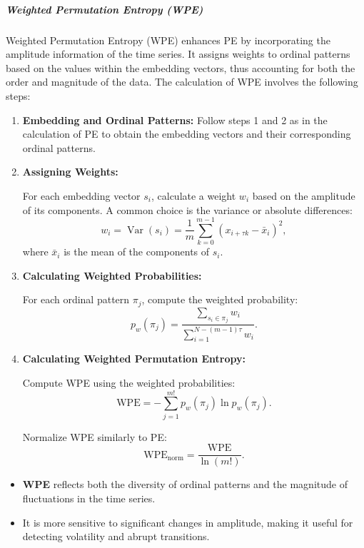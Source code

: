 \subparagraph{Weighted Permutation Entropy (WPE)}
Weighted Permutation Entropy (WPE) enhances PE by incorporating the amplitude information of the time series. It assigns weights to ordinal patterns based on the values within the embedding vectors, thus accounting for both the order and magnitude of the data.
The calculation of \ac{WPE} involves the following steps:

\begin{enumerate} \item \textbf{Embedding and Ordinal Patterns:}
Follow steps 1 and 2 as in the calculation of PE to obtain the embedding vectors and their corresponding ordinal patterns.

\item \textbf{Assigning Weights:}

For each embedding vector $s_i$, calculate a weight $w_i$ based on the amplitude of its components. A common choice is the variance or absolute differences:
\begin{equation}
    w_i = \operatorname{Var}(s_i) = \frac{1}{m} \sum_{k=0}^{m-1} \left( x_{i+\tau k} - \bar{x}_i \right)^2,
\end{equation}
where $\bar{x}_i$ is the mean of the components of $s_i$.

\item \textbf{Calculating Weighted Probabilities:}

For each ordinal pattern $\pi_j$, compute the weighted probability:
\begin{equation}
    p_w(\pi_j) = \frac{\sum_{s_i \in \pi_j} w_i}{\sum_{i=1}^{N - (m -1)\tau} w_i}.
\end{equation}

\item \textbf{Calculating Weighted Permutation Entropy:}

Compute \ac{WPE} using the weighted probabilities:
\begin{equation}
    \mathrm{WPE} = - \sum_{j=1}^{m!} p_w(\pi_j) \ln p_w(\pi_j).
\end{equation}

Normalize WPE similarly to PE:
\begin{equation}
    \mathrm{WPE}_{\text{norm}} = \frac{\mathrm{WPE}}{\ln(m!)}.
\end{equation}
\end{enumerate}
\begin{itemize} \item \textbf{WPE} reflects both the diversity of ordinal patterns and the magnitude of fluctuations in the time series. \item It is more sensitive to significant changes in amplitude, making it useful for detecting volatility and abrupt transitions. \end{itemize}

